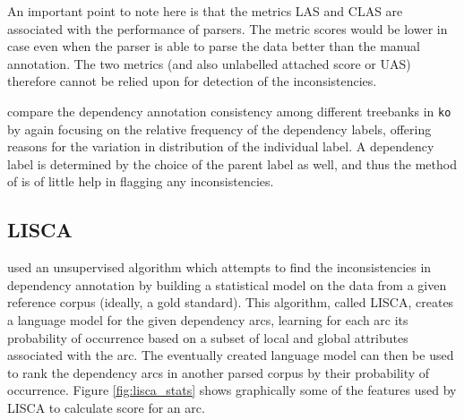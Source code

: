 An important point to note here is that the metrics LAS and CLAS are associated with the performance of parsers. The metric scores would be lower in case even when the parser is able to parse the data better than the manual annotation. The two metrics (and also unlabelled attached score or UAS) therefore cannot be relied upon for detection of the inconsistencies.

\cite{korean} compare the dependency annotation consistency among different treebanks in \verb|ko| by again focusing on the relative frequency of the dependency labels, offering reasons for the variation in distribution of the individual label. A dependency label is determined by the choice of the parent label as well, and thus the method of \citeauthor{korean} is of little help in flagging any inconsistencies.

\subsection{LISCA}
\label{ssec:lisca_soln}

\cite{lisca} used an unsupervised algorithm which attempts to find the inconsistencies in dependency annotation by building a statistical model on the data from a given reference corpus (ideally, a gold standard). This algorithm, called LISCA, creates a language model for the given dependency arcs, learning for each arc its probability of occurrence based on a subset of local and global attributes associated with the arc. The eventually created language model can then be used to rank the dependency arcs in another parsed corpus by their probability of occurrence. Figure \ref{fig:lisca_stats} shows graphically some of the features used by LISCA to calculate score for an arc.

